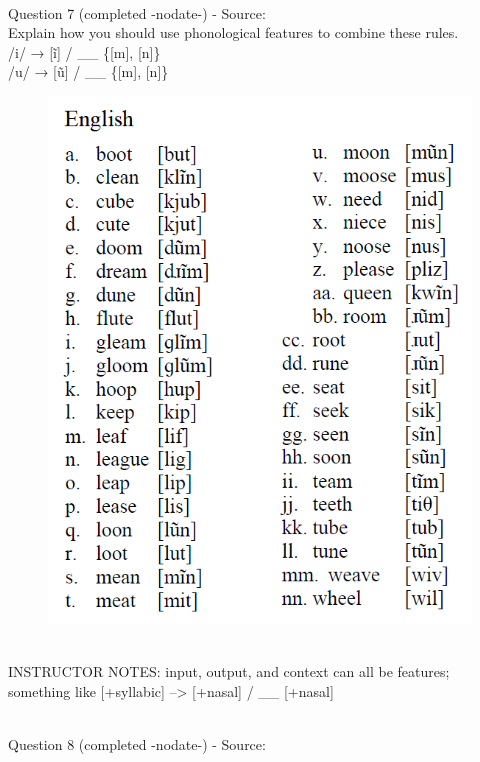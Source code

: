 \documentclass[12pt]{article}
\begin{document}
~\\

{\large Question 7} (completed -nodate-) - Source: \\

Explain how you should use phonological features to combine these rules.\\

/i/ → {[ĩ]} / \_\_ \{{[m]}, {[n]}\}\\/u/ → {[ũ]} / \_\_ \{{[m]}, {[n]}\}

\begin{figure}[H]
\includegraphics{../images/english_nasalization.png}
\end{figure}

~\\
INSTRUCTOR NOTES: input, output, and context can all be features; something like [+syllabic] --> [+nasal] / \_\_ [+nasal]


~\\

{\large Question 8} (completed -nodate-) - Source: \\
\end{document}
